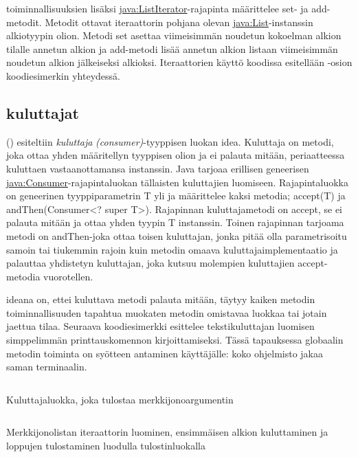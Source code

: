 \documentclass{tufte-book}
\newcommand{\eng}[1]{\textit{(#1)}}
\newcommand{\new}[1]{\textit{\gls{#1}}}
\newcommand{\neweng}[2]{\new{#1} \eng{#2}}
\newcommand{\java}[1]{\underline{\gls{java:#1}}}
\newcommand{\code}[3]{
\begin{listing}
    \inputminted{java}{OhjelmointiopasEsimerkit/src/#1/#2.java}
    \caption{#3}
    \label{Java-#1-#2}
\end{listing}
}
\begin{document}
 toiminnallisuuksien lisäksi \java{ListIterator}-rajapinta
määrittelee set- ja add-metodit. Metodit ottavat iteraattorin pohjana olevan 
\java{List}-instanssin alkiotyypin olion. Metodi set asettaa viimeisimmän noudetun kokoelman
alkion tilalle annetun alkion ja add-metodi lisää annetun alkion listaan viimeisimmän noudetun
alkion jälkeiseksi alkioksi. Iteraattorien käyttö koodissa esitellään -osion
koodiesimerkin yhteydessä.

\subsection{kuluttajat}
\label{consumers}

 () esiteltiin
\neweng{kuluttaja}{consumer}-tyyppisen luokan idea. Kuluttaja on metodi, joka ottaa yhden
määritellyn tyyppisen olion ja ei palauta mitään, periaatteessa kuluttaen vastaanottamansa
instanssin. Java tarjoaa erillisen geneerisen \java{Consumer}-rajapintaluokan tällaisten
kuluttajien luomiseen. Rajapintaluokka on geneerinen tyyppiparametrin T yli ja määrittelee kaksi
metodia; accept(T) ja andThen(Consumer<? super T>). Rajapinnan kuluttajametodi on accept, se ei
palauta mitään ja ottaa yhden tyypin T instanssin. Toinen rajapinnan tarjoama metodi on
andThen-joka ottaa toisen kuluttajan, jonka pitää olla parametrisoitu samoin tai tiukemmin rajoin
kuin metodin omaava kuluttajaimplementaatio ja palauttaa yhdistetyn kuluttajan, joka kutsuu
molempien kuluttajien accept-metodia vuorotellen.

 ideana on, ettei kuluttava metodi palauta
mitään, täytyy kaiken metodin toiminnallisuuden tapahtua muokaten metodin omistavaa luokkaa tai
jotain jaettua tilaa. Seuraava koodiesimerkki esittelee tekstikuluttajan luomisen simppelimmän
printtauskomennon kirjoittamiseksi. Tässä tapauksessa globaalin metodin toiminta on syötteen
antaminen käyttäjälle: koko ohjelmisto jakaa saman terminaalin.

\code{week10/iteratorexample}{Printer}{Kuluttajaluokka, joka tulostaa merkkijonoargumentin}
\code{week10/iteratorexample}{IteratorExample}{Merkkijonolistan iteraattorin luominen, ensimmäisen
alkion kuluttaminen ja loppujen tulostaminen luodulla tulostinluokalla}

\end{document}
